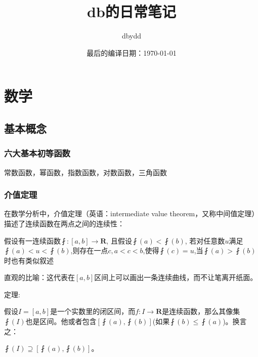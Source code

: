 \documentclass[UTF8]{ctexbook}
\title{db的日常笔记}
\date{最后的编译日期：\today}
\author{dbydd}
\begin{document}
\setcounter{page}{1}
\chapter{数学}{
\section{基本概念}{
\subsection{六大基本初等函数}{
  常数函数，幂函数，指数函数，对数函数，三角函数
}%

\subsection{介值定理}{
在数学分析中，介值定理（英语：intermediate value theorem，又称中间值定理）描述了连续函数在两点之间的连续性：

假设有一连续函数$\fint:[a,b]\rightarrow \mathbf{R}$, 且假设$\fint(a)<\fint(b)$, 若对任意数$u$满足$\fint(a)<u<\fint(b)$,则存在一点$c,a<c<b$,使得$\fint(c) = u$,当$\fint(a)>\fint(b)$时也有类似叙述

直观的比喻：这代表在$[a,b]$区间上可以画出一条连续曲线，而不让笔离开纸面。
\newline

定理:

假设$I = [a,b]$是一个实数里的闭区间，而$f:I\rightarrow\mathbf{R}$是连续函数，那么其像集$\fint(I)$也是区间。他或者包含$[\fint(a),\fint(b)]$(如果$\fint(b)\leq\fint(a)$)。换言之：

$\fint(I)\supseteq[\fint(a),\fint(b)]$。

}}}
\end{document}
